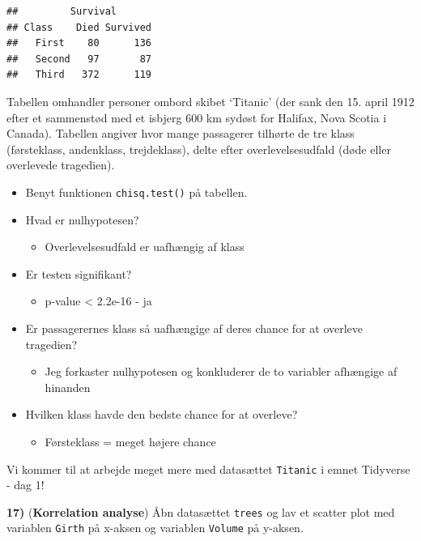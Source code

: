 \documentclass[
]{book}
\providecommand{\tightlist}{%
  \setlength{\itemsep}{0pt}\setlength{\parskip}{0pt}}
\begin{document}
\begin{verbatim}
##         Survival
## Class    Died Survived
##   First    80      136
##   Second   97       87
##   Third   372      119
\end{verbatim}

Tabellen omhandler personer ombord skibet `Titanic' (der sank den 15. april 1912 efter et sammenstød med et isbjerg 600 km sydøst for Halifax, Nova Scotia i Canada). Tabellen angiver hvor mange passagerer tilhørte de tre klass (førsteklass, andenklass, trejdeklass), delte efter overlevelsesudfald (døde eller overlevede tragedien).

\begin{itemize}
\item
  Benyt funktionen \texttt{chisq.test()} på tabellen.
\item
  Hvad er nulhypotesen?

  \begin{itemize}
  \tightlist
  \item
    Overlevelsesudfald er uafhængig af klass
  \end{itemize}
\item
  Er testen signifikant?

  \begin{itemize}
  \tightlist
  \item
    p-value \textless{} 2.2e-16 - ja
  \end{itemize}
\item
  Er passagerernes klass så uafhængige af deres chance for at overleve tragedien?

  \begin{itemize}
  \tightlist
  \item
    Jeg forkaster nulhypotesen og konkluderer de to variabler afhængige af hinanden
  \end{itemize}
\item
  Hvilken klass havde den bedste chance for at overleve?

  \begin{itemize}
  \tightlist
  \item
    Førsteklass = meget højere chance
  \end{itemize}
\end{itemize}

Vi kommer til at arbejde meget mere med datasættet \texttt{Titanic} i emnet Tidyverse - dag 1!

\textbf{17)} (\textbf{Korrelation analyse}) Åbn datasættet \texttt{trees} og lav et scatter plot med variablen \texttt{Girth} på x-aksen og variablen \texttt{Volume} på y-aksen.
\end{document}
